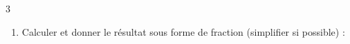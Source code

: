 \documentclass[a4paper]{book}
\begin{document}
{\begin{exerciceNote}{3}
\begin{enumerate}
            \vspace{0.5cm}
            \begin{minipage}[t]{0.23\textwidth}
                les $\frac{3}{4}$ de $24$ kg. \\
                \color{red}\bfseries
                $\dfrac{3 \times 24}{4} = 3 \times 6$ \\
                $= 18\text{ kg}$
            \vspace{1.3cm}
            \end{minipage}\hfill \vline \hfill
            \begin{minipage}[t]{0.23\textwidth}
                \raggedright
                les $\frac{8}{5}$ de $120$ \euro. \\
                \color{red}\bfseries
                $\dfrac{8 \times 120}{5} = 8 \times 24$ \\
                $= 192\text{ \euro}$
                \vspace{1.3cm}
            \end{minipage}

            \vspace{0.5cm}
            
            \item Calculer et donner le résultat sous forme de fraction (simplifier si possible) :
        \end{enumerate}
        

\end{exerciceNote}}
\end{document}
